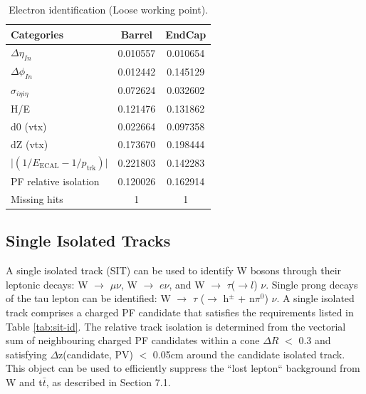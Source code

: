 \begin{table}[h!]
  \caption{Electron identification (Loose working point).\label{tab:ele-id}}
  \centering
  \footnotesize
  \begin{tabular}{ lcc }
    \hline
    \hline
    Categories                                               & Barrel    & EndCap    \\
    \hline
    $\Delta \eta_{In}$                                       & 0.010557  & 0.010654  \\
    $\Delta \phi_{In}$                                       & 0.012442  & 0.145129  \\
    $\sigma_{i\eta i\eta}$                                   & 0.072624  & 0.032602  \\
    H/E                                                      & 0.121476  & 0.131862  \\
    d0 (vtx)                                                 & 0.022664  & 0.097358  \\
    dZ (vtx)                                                 & 0.173670  & 0.198444  \\
    $\lvert(1/E_{\textrm{ECAL}} - 1/p_{\textrm{trk}})\rvert$ & 0.221803  & 0.142283  \\
    PF relative isolation                                    & 0.120026  & 0.162914  \\
    Missing hits                                             & 1         & 1         \\
    \hline
    \hline
  \end{tabular}
  \end{table}


\subsection{Single Isolated Tracks}
\label{sec:SIT}

A single isolated track (SIT) can be used to identify W bosons through their leptonic decays: W $\rightarrow$ $\mu \nu$, W $\rightarrow$ $e\nu$, and W $\rightarrow$ $\tau$($\rightarrow l$) $\nu$. Single prong decays of the tau lepton can be identified: W $\rightarrow$ $\tau$ ($\rightarrow$ h$^{\pm}$ + n$\pi^{0}$) $\nu$. A single isolated track comprises a charged PF candidate that satisfies the requirements listed in Table \ref{tab:sit-id}. The relative track isolation is determined from the vectorial sum of neighbouring charged PF candidates within a cone $\Delta R$ $<$ 0.3 and satisfying $\Delta$z(candidate, PV) $<$ 0.05cm around the candidate isolated track.
This object can be used to efficiently suppress the ``lost lepton`` background from W and t$\bar{t}$, as described in Section 7.1. 

